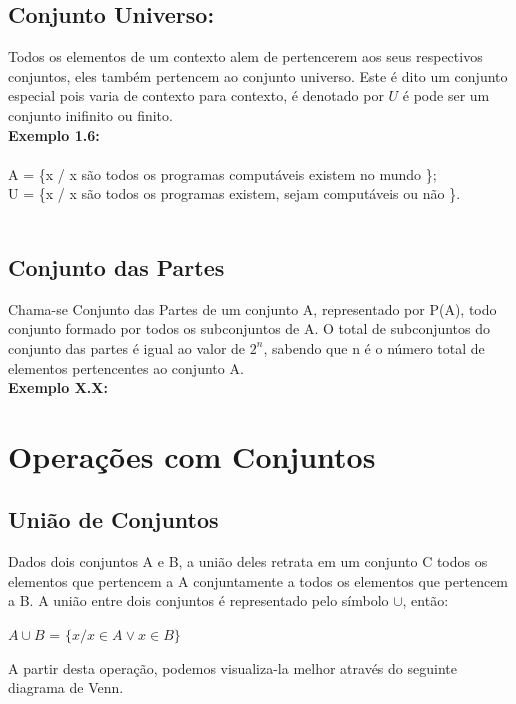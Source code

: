 \documentclass[a4paper,12pt,twoside,BCOR=10mm]{scrbook}
\begin{document}
\begin{titlepage}
\subsection{Conjunto Universo:}
Todos os elementos de um contexto alem de pertencerem aos seus respectivos conjuntos, eles também pertencem ao conjunto universo. Este é dito um conjunto especial pois varia de contexto para contexto, é denotado por $U$ é pode ser um conjunto inifinito ou finito. \\
\textbf{Exemplo 1.6:}\\ \\
A = \{x / x são todos os programas computáveis existem no mundo \};\\
U = \{x / x são todos os programas existem, sejam computáveis ou não \}.\\ \\

\subsection{Conjunto das Partes}
Chama-se Conjunto das Partes de um conjunto A, representado por P(A), todo conjunto formado por todos os subconjuntos de A. O total de subconjuntos do conjunto das partes é igual ao valor de $2^{n}$, sabendo que n é o número total de elementos pertencentes ao conjunto A.
\\
\textbf{Exemplo X.X:}\\
\begin{itemize}
\item C = $\{$a,b$\}$
\item P(C) = {$\emptyset$, $\{a\}$,$\{b\}$,$\{a,b\}\}$
\item[]
\item A = $\emptyset$
\item P(A) = $\{ \emptyset \}$ 
\end{itemize}

\section{Operações com Conjuntos}
\subsection{União de Conjuntos}
Dados dois conjuntos A e B, a união deles retrata em um conjunto C todos os elementos que pertencem a A conjuntamente a todos os elementos que pertencem a B. A união entre dois conjuntos é representado pelo símbolo $\cup$, então:\\
\begin{center}
$A \cup B$ = $\{x/ x \in A \vee x \in B \}$
\end{center}
A partir desta operação, podemos visualiza-la melhor através do seguinte diagrama de Venn.



\end{titlepage}
\end{document}
